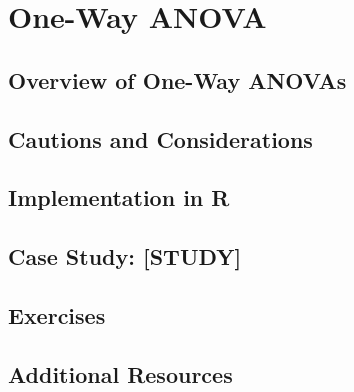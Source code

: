 
\chapter{One-Way ANOVA}

\section{Overview of One-Way ANOVAs}

\section{Cautions and Considerations}

\section{Implementation in R}

\section{Case Study: [STUDY]}

\section{Exercises}

\section{Additional Resources}
